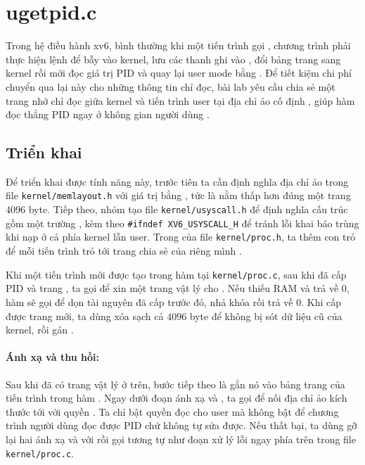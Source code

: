 \section{ugetpid.c}
Trong hệ điều hành xv6, bình thường khi một tiến trình gọi
, chương trình phải thực hiện lệnh  để bẫy
vào kernel, lưu các thanh ghi vào , đổi bảng trang
sang kernel rồi mới đọc giá trị PID và quay lại user mode bằng
 \cite{xv6book}. Để tiết kiệm chi phí chuyển qua lại này
cho những thông tin chỉ đọc, bài lab yêu cầu chia sẻ một trang nhớ chỉ
đọc giữa kernel và tiến trình user tại địa chỉ ảo cố định
, giúp hàm  đọc thẳng PID ngay ở không
gian người dùng \cite{hcmus_os_lab3,mitpgtbl}.

\subsection{Triển khai}
Để triển khai được tính năng này, trước tiên ta cần định nghĩa địa chỉ
ảo  trong file \texttt{kernel/memlayout.h} với giá trị
bằng , tức là nằm thấp hơn 
đúng một trang $4096$ byte. Tiếp theo, nhóm tạo file
\texttt{kernel/usyscall.h} để định nghĩa cấu trúc
 gồm một trường , kèm theo
\texttt{\#ifndef XV6\_USYSCALL\_H} để tránh lỗi khai báo trùng khi nạp
ở cả phía kernel lẫn user. Trong  của file
\texttt{kernel/proc.h}, ta thêm con trỏ  để mỗi tiến trình trỏ tới trang chia sẻ của riêng mình
\cite{xv6vm}.

Khi một tiến trình mới được tạo trong hàm  tại
\texttt{kernel/proc.c}, sau khi đã cấp PID và trang ,
ta gọi  để xin một trang vật lý cho .
Nếu thiếu RAM và  trả về $0$, hàm sẽ gọi
 để dọn tài nguyên đã cấp trước đó, nhả khóa
 rồi trả về $0$. Khi cấp được trang mới, ta
dùng  xóa sạch cả $4096$ byte để không bị sót dữ liệu
cũ của kernel, rồi gán .

\paragraph*{Ánh xạ và thu hồi:} Sau khi đã có trang vật lý ở trên,
bước tiếp theo là gắn nó vào bảng trang của tiến trình trong hàm
. Ngay dưới đoạn ánh xạ  và
, ta gọi  để nối địa chỉ ảo
 kích thước  tới 
với quyền . Ta chỉ bật quyền đọc cho user mà không
bật  để chương trình người dùng đọc được PID chứ không tự
sửa được. Nếu  thất bại, ta dùng  gỡ
lại hai ánh xạ  và  với
 rồi gọi  tương tự như
đoạn xử lý lỗi ngay phía trên trong file \texttt{kernel/proc.c}.

